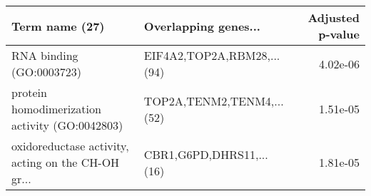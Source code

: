 \begin{tabular}{llr}
\toprule
                                    Term name (27) &       Overlapping genes... &  Adjusted p-value \\
\midrule
                          RNA binding (GO:0003723) & EIF4A2,TOP2A,RBM28,...(94) &          4.02e-06 \\
    protein homodimerization activity (GO:0042803) &  TOP2A,TENM2,TENM4,...(52) &          1.51e-05 \\
oxidoreductase activity, acting on the CH-OH gr... &   CBR1,G6PD,DHRS11,...(16) &          1.81e-05 \\
\bottomrule
\end{tabular}
